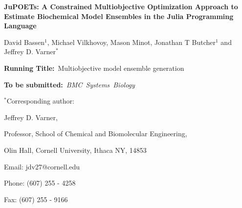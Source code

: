 \documentclass[12pt]{article}
\begin{document}
\begin{titlepage}
{\par\centering\textbf{\Large {JuPOETs: A Constrained Multiobjective Optimization Approach to Estimate Biochemical Model Ensembles in the Julia Programming Language}}}
\vspace{0.05in}
{\par \centering \large{David Bassen$^{1}$, Michael Vilkhovoy, Mason Minot, Jonathan T Butcher$^{1}$ and Jeffrey D. Varner$^{*}$}}
\vspace{0.10in}
{\par {}}
{\par {}}
\vspace{0.1in}
{\par \centering \textbf{Running Title:}~Multiobjective model ensemble generation}
\vspace{0.1in}
{\par \centering \textbf{To be submitted:}~\emph{BMC~Systems~Biology}}
\vspace{0.1in}
{\par \centering $^{*}$Corresponding author:}
{\par \centering Jeffrey D. Varner,}
{\par \centering Professor, School of Chemical and Biomolecular Engineering,}
{\par {} Olin Hall, Cornell University, Ithaca NY, 14853}
{\par \centering Email: jdv27@cornell.edu}
{\par \centering Phone: (607) 255 - 4258}
{\par \centering Fax: (607) 255 - 9166}
\end{titlepage}
\date{}
\thispagestyle{empty}
\pagebreak
\end{document}
